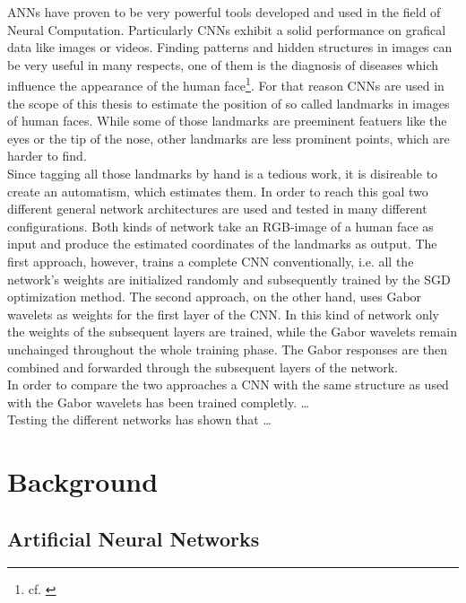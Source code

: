 \documentclass[11pt, a4paper]{article}
\begin{document}
\acp{ANN} have proven to be very powerful tools developed and used in the field of Neural Computation. Particularly \acp{CNN} exhibit a solid performance on grafical data like images or videos. Finding patterns and hidden structures in images can be very useful in many respects, one of them is the diagnosis of diseases which influence the appearance of the human face\footnote{cf. \cite{ebgm}}. For that reason \acp{CNN} are used in the scope of this thesis to estimate the position of so called landmarks in images of human faces. While some of those landmarks are preeminent featuers like the eyes or the tip of the nose, other landmarks are less prominent points, which are harder to find.\\
Since tagging all those landmarks by hand is a tedious work, it is disireable to create an automatism, which estimates them. In order to reach this goal two different general network architectures are used and tested in many different configurations. Both kinds of network take an RGB-image of a human face as input and produce the estimated coordinates of the landmarks as output. The first approach, however, trains a complete \ac{CNN} conventionally, i.e. all the network's weights are initialized randomly and subsequently trained by the \ac{SGD} optimization method. The second approach, on the other hand, uses Gabor wavelets as weights for the first layer of the \ac{CNN}. In this kind of network only the weights of the subsequent layers are trained, while the Gabor wavelets remain unchainged throughout the whole training phase. The Gabor responses are then combined and forwarded through the subsequent layers of the network.\\
In order to compare the two approaches a \ac{CNN} with the same structure as used with the Gabor wavelets has been trained completly. \dots\\%
Testing the different networks has shown that \dots%


\newpage

\section{Background}

\subsection{Artificial Neural Networks}
\end{document}
